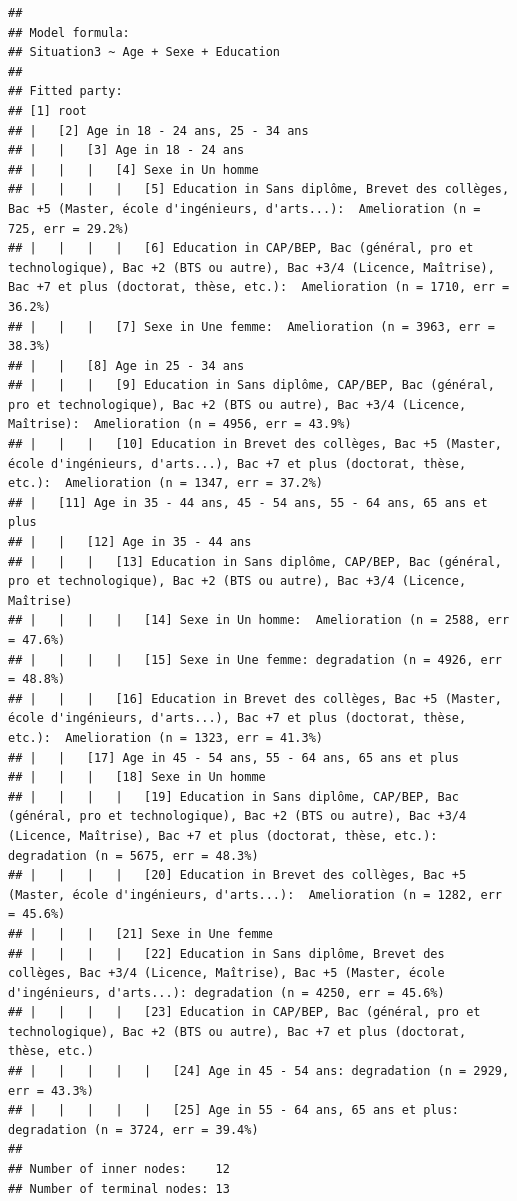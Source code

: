 \documentclass[
]{book}
\begin{document}
\begin{verbatim}
## 
## Model formula:
## Situation3 ~ Age + Sexe + Education
## 
## Fitted party:
## [1] root
## |   [2] Age in 18 - 24 ans, 25 - 34 ans
## |   |   [3] Age in 18 - 24 ans
## |   |   |   [4] Sexe in Un homme
## |   |   |   |   [5] Education in Sans diplôme, Brevet des collèges, Bac +5 (Master, école d'ingénieurs, d'arts...):  Amelioration (n = 725, err = 29.2%)
## |   |   |   |   [6] Education in CAP/BEP, Bac (général, pro et technologique), Bac +2 (BTS ou autre), Bac +3/4 (Licence, Maîtrise), Bac +7 et plus (doctorat, thèse, etc.):  Amelioration (n = 1710, err = 36.2%)
## |   |   |   [7] Sexe in Une femme:  Amelioration (n = 3963, err = 38.3%)
## |   |   [8] Age in 25 - 34 ans
## |   |   |   [9] Education in Sans diplôme, CAP/BEP, Bac (général, pro et technologique), Bac +2 (BTS ou autre), Bac +3/4 (Licence, Maîtrise):  Amelioration (n = 4956, err = 43.9%)
## |   |   |   [10] Education in Brevet des collèges, Bac +5 (Master, école d'ingénieurs, d'arts...), Bac +7 et plus (doctorat, thèse, etc.):  Amelioration (n = 1347, err = 37.2%)
## |   [11] Age in 35 - 44 ans, 45 - 54 ans, 55 - 64 ans, 65 ans et plus
## |   |   [12] Age in 35 - 44 ans
## |   |   |   [13] Education in Sans diplôme, CAP/BEP, Bac (général, pro et technologique), Bac +2 (BTS ou autre), Bac +3/4 (Licence, Maîtrise)
## |   |   |   |   [14] Sexe in Un homme:  Amelioration (n = 2588, err = 47.6%)
## |   |   |   |   [15] Sexe in Une femme: degradation (n = 4926, err = 48.8%)
## |   |   |   [16] Education in Brevet des collèges, Bac +5 (Master, école d'ingénieurs, d'arts...), Bac +7 et plus (doctorat, thèse, etc.):  Amelioration (n = 1323, err = 41.3%)
## |   |   [17] Age in 45 - 54 ans, 55 - 64 ans, 65 ans et plus
## |   |   |   [18] Sexe in Un homme
## |   |   |   |   [19] Education in Sans diplôme, CAP/BEP, Bac (général, pro et technologique), Bac +2 (BTS ou autre), Bac +3/4 (Licence, Maîtrise), Bac +7 et plus (doctorat, thèse, etc.): degradation (n = 5675, err = 48.3%)
## |   |   |   |   [20] Education in Brevet des collèges, Bac +5 (Master, école d'ingénieurs, d'arts...):  Amelioration (n = 1282, err = 45.6%)
## |   |   |   [21] Sexe in Une femme
## |   |   |   |   [22] Education in Sans diplôme, Brevet des collèges, Bac +3/4 (Licence, Maîtrise), Bac +5 (Master, école d'ingénieurs, d'arts...): degradation (n = 4250, err = 45.6%)
## |   |   |   |   [23] Education in CAP/BEP, Bac (général, pro et technologique), Bac +2 (BTS ou autre), Bac +7 et plus (doctorat, thèse, etc.)
## |   |   |   |   |   [24] Age in 45 - 54 ans: degradation (n = 2929, err = 43.3%)
## |   |   |   |   |   [25] Age in 55 - 64 ans, 65 ans et plus: degradation (n = 3724, err = 39.4%)
## 
## Number of inner nodes:    12
## Number of terminal nodes: 13
\end{verbatim}
\end{document}
